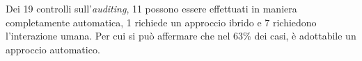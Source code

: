 \makeatother
Dei 19 controlli sull'\textit{auditing}, 11 possono essere effettuati in maniera completamente automatica, 1 richiede un approccio ibrido e 7 richiedono l'interazione umana.
Per cui si può affermare che nel 63\% dei casi, è adottabile un approccio automatico.


